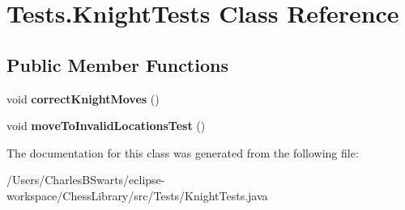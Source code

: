 \hypertarget{class_tests_1_1_knight_tests}{}\section{Tests.\+Knight\+Tests Class Reference}
\label{class_tests_1_1_knight_tests}
\subsection*{Public Member Functions}
\begin{DoxyCompactItemize}
\item 
\mbox{\label{class_tests_1_1_knight_tests_afdbd552cb2923f8c8713acb7aed18988}} 
void {\bfseries correct\+Knight\+Moves} ()
\item 
\mbox{\label{class_tests_1_1_knight_tests_a36198195b7c415dfd173cd75b463268f}} 
void {\bfseries move\+To\+Invalid\+Locations\+Test} ()
\end{DoxyCompactItemize}


The documentation for this class was generated from the following file\+:\begin{DoxyCompactItemize}
\item 
/\+Users/\+Charles\+B\+Swarts/eclipse-\/workspace/\+Chess\+Library/src/\+Tests/Knight\+Tests.\+java\end{DoxyCompactItemize}
